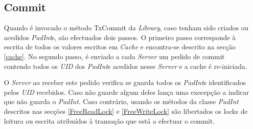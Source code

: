 \subsection{Commit}
\label{commit}

Quando é invocado o método TxCommit da \textit{Library}, caso tenham sido criados ou acedidos \textit{PadInt}s, são efectuados dois passos. O primeiro passo corresponde à escrita de todos os valores escritos em \textit{Cache} e encontra-se descrito na secção \ref{cache}. No segundo passo, é enviado a cada \textit{Server} um pedido de commit contendo todos os \textit{UID} dos \textit{PadInt}s acedidos nesse \textit{Server} e a cache é re-iniciada.

O \textit{Server} ao receber este pedido verifica se guarda todos os \textit{PadInt}s identificados pelos \textit{UID} recebidos. Caso não guarde algum deles lança uma execepção a indicar que não guarda o \textit{PadInt}. Caso contrário, usando os métodos da classe \textit{PadInt} descritos nas secções \ref{FreeReadLock} e \ref{FreeWriteLock} são libertados os locks de leitura ou escrita atribuídos à transação que está a efectuar o commit.